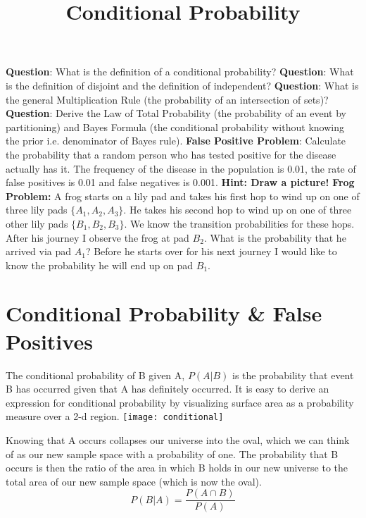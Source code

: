 




\title{Conditional Probability}
\date{}
\maketitle

\noindent
\textbf{Question}: What is the definition of a conditional probability?
\nn
\textbf{Question}: What is the definition of disjoint and the definition of independent?
\nn
\textbf{Question}: What is the general Multiplication Rule (the probability of an intersection of sets)?
\nn
\textbf{Question}: Derive the Law of Total Probability (the probability of an event by partitioning) and Bayes Formula (the conditional probability without knowing the prior i.e. denominator of Bayes rule).
\nn
\textbf{False Positive Problem}: Calculate the probability that a random person who has tested positive for the disease actually has it. The frequency of the disease in the population is 0.01, the rate of false positives is 0.01 and false negatives is 0.001. \textbf{Hint: Draw a picture!}
\nn
\textbf{Frog Problem:} A frog starts on a lily pad and takes his first hop to wind up on one of three lily pads $\{A_1,A_2,A_3\}$. He takes his second hop to wind up on one of three other lily pads $\{B_1,B_2,B_3\}$. We know the transition probabilities for these hops. After his journey I observe the frog at pad $B_2$. What is the probability that he arrived via pad $A_1$? Before he starts over for his next journey I would like to know the probability he will end up on pad $B_1$.\n

\vspace{.3 in}

\tableofcontents

\section{Conditional Probability \& False Positives}
The conditional probability of B given A, $P(A|B)$ is the probability that event B has occurred given that A has definitely occurred. It is easy to derive an expression for conditional probability by visualizing surface area as a probability measure over a 2-d region.
\nn
\texttt{[image: conditional]} 

Knowing that A occurs collapses our universe into the oval, which we can think of as our new sample space with a probability of one. The probability that B occurs is then the ratio of the area in which B holds in our new universe to the total area of our new sample space (which is now the oval). 
\begin{equation}
P(B|A) = \frac{P(A\cap B)}{P(A)}
\end{equation}
\n




